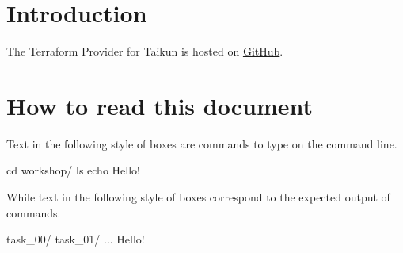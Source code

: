 \section{Introduction}

The Terraform Provider for Taikun is hosted on \href{https://github.com/itera-io/terraform-provider-taikun}{GitHub}.
\blindtext{}

\section{How to read this document}

Text in the following style of boxes are commands to type on the command line.
\begin{shell}
cd workshop/
ls
echo Hello!
\end{shell}
While text in the following style of boxes correspond to the expected output of commands.
\begin{raw}
task_00/
task_01/
...
Hello!
\end{raw}
